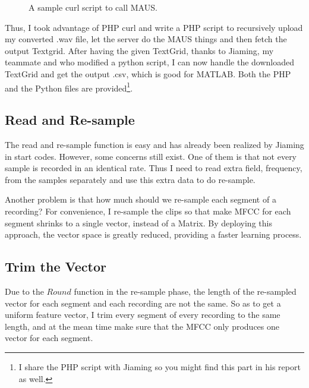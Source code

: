 \documentclass{sig-alternate}
\begin{document}
\begin{figure}
\centering
{}
\caption{A sample curl script to call MAUS.}
\end{figure}

Thus, I took advantage of PHP curl and write a PHP script to recursively upload my converted .wav file, let the server do the MAUS things and then fetch the output Textgrid. After having the given TextGrid, thanks to Jiaming, my teammate and who modified a python script, I can now handle the downloaded TextGrid and get the output .csv, which is good for MATLAB. Both the PHP and the Python files are provided\footnote{I share the PHP script with Jiaming so you might find this part in his report as well.}.

\subsection{Read and Re-sample}
The read and re-sample function is easy and has already been realized by Jiaming in start codes. However, some concerns still exist. One of them is that not every sample is recorded in an identical rate. Thus I need to read extra field, frequency, from the samples separately and use this extra data to do re-sample. 

Another problem is that how much should we re-sample each segment of a recording? For convenience, I re-sample the clips so that make MFCC for each segment shrinks to a single vector, instead of a Matrix. By deploying this approach, the vector space is greatly reduced, providing a faster learning process. 


\subsection{Trim the Vector}
Due to the $Round$ function in the re-sample phase, the length of the re-sampled vector for each segment and each recording are not the same. So as to get a uniform feature vector, I trim every segment of every recording to the same length, and at the mean time make sure that the MFCC only produces one vector for each segment.
\end{document}
